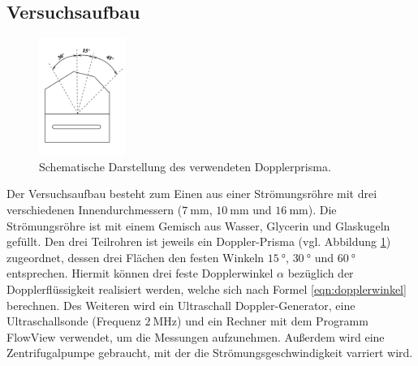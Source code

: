 \subsection{Versuchsaufbau}
\label{sec:Versuchsaufbau}
\begin{figure}
  \centering
  \includegraphics[width=0.25\textwidth]{Bilder/prisma.png}
  \caption{Schematische Darstellung des verwendeten Dopplerprisma. \cite{Anleitung}}
  \label{fig:dopplerprisma}
\end{figure}
Der Versuchsaufbau besteht zum Einen aus einer Strömungsröhre mit drei verschiedenen
Innendurchmessern ($\SI{7}{\milli\meter}$, $\SI{10}{\milli\meter}$ und $\SI{16}{\milli\meter}$).
Die Strömungsröhre ist mit einem Gemisch aus Wasser, Glycerin und Glaskugeln gefüllt.
Den drei Teilrohren ist jeweils ein Doppler-Prisma (vgl. Abbildung
\ref{fig:dopplerprisma}) zugeordnet, dessen drei Flächen den festen Winkeln $\SI{15}{\degree}$,
$\SI{30}{\degree}$ und $\SI{60}{\degree}$ entsprechen. Hiermit können drei feste Dopplerwinkel $\alpha$ bezüglich der Dopplerflüssigkeit realisiert werden, welche sich nach Formel \eqref{eqn:dopplerwinkel} berechnen.
Des Weiteren wird ein Ultraschall Doppler-Generator, eine Ultraschallsonde (Frequenz
$\SI{2}{\mega\hertz}$) und ein Rechner mit dem Programm FlowView verwendet, um die Messungen
aufzunehmen. Außerdem wird eine Zentrifugalpumpe gebraucht, mit der die
Strömungsgeschwindigkeit
varriert wird.
